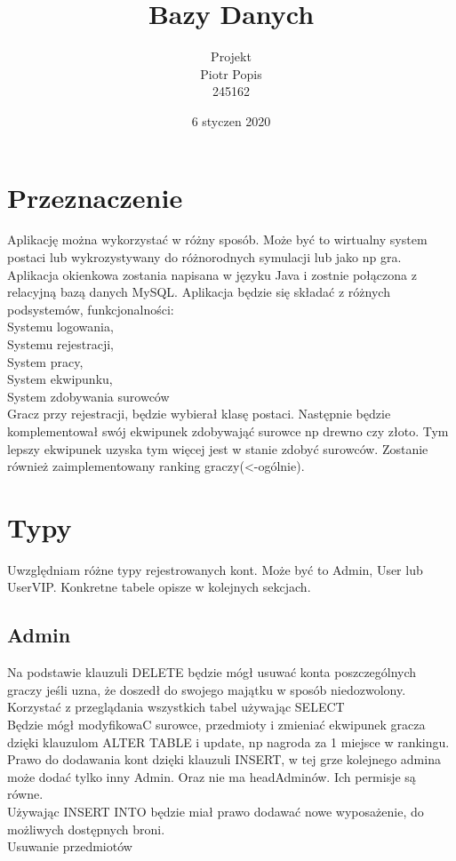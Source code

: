 \documentclass[11pt]{article}
\begin{document}
\title{{Bazy Danych}}
\author{Projekt\\Piotr Popis\\ 245162}
\date{6 styczen 2020}
\maketitle
\centering
\begin{flushleft}
\section{Przeznaczenie}
Aplikację można wykorzystać w różny sposób. Może być to wirtualny system  postaci lub wykrozystywany do różnorodnych symulacji lub jako np gra. Aplikacja okienkowa zostania napisana w języku Java i zostnie połączona  z relacyjną bazą danych MySQL. Aplikacja będzie się składać z różnych podsystemów, funkcjonalności: \\Systemu logowania,\\
Systemu rejestracji,\\
System pracy,\\
System ekwipunku,\\
System zdobywania surowców\\
Gracz przy rejestracji, będzie wybierał klasę postaci. Następnie będzie komplementował swój ekwipunek zdobywająć surowce np drewno czy złoto. Tym lepszy ekwipunek uzyska tym więcej jest w stanie zdobyć surowców. Zostanie również zaimplementowany ranking graczy(<-ogólnie).
\section{Typy}
Uwzględniam różne typy rejestrowanych kont. Może być to Admin, User lub UserVIP. Konkretne tabele opisze w kolejnych sekcjach.
\subsection{Admin}
Na podstawie klauzuli DELETE będzie mógł usuwać konta poszczególnych graczy jeśli uzna, że doszedł do swojego majątku w sposób niedozwolony.
\\Korzystać z przeglądania wszystkich tabel używając SELECT
\\Będzie mógł modyfikowaC surowce, przedmioty i zmieniać  ekwipunek  gracza dzięki klauzulom ALTER TABLE i update, np nagroda za 1 miejsce w rankingu.
\\Prawo do dodawania kont dzięki klauzuli INSERT, w tej grze kolejnego admina może dodać tylko inny Admin. Oraz nie ma headAdminów. Ich permisje są równe.
\\Używając INSERT INTO będzie miał prawo dodawać nowe wyposażenie, do możliwych dostępnych broni.
\\Usuwanie przedmiotów


\end{flushleft}
\end{document}
